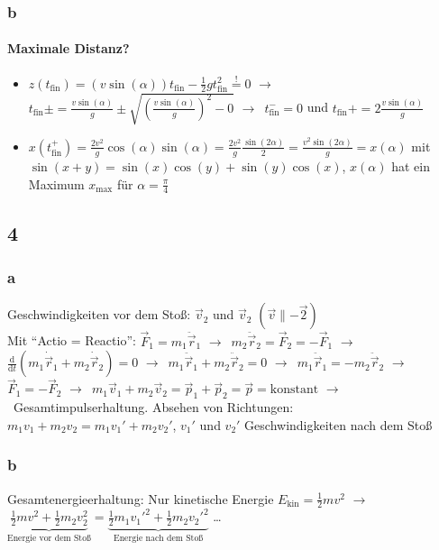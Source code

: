 \documentclass[oneside]{book}
\theoremstyle{definition}
\newcommand{\conseq}{$\rightarrow$~}
\renewcommand{\d}{\mathrm d}
\newcommand{\dd}[1]{\frac{\d}{\d #1}}
\newcommand{\dotvec}[1]{\dot{\vec{#1}}}
\newcommand{\ddotvec}[1]{\ddot{\vec{#1}}}
\newcommand{\tfin}{t_\text{fin}}
\begin{document}
\subsubsection{b}

\paragraph{Maximale Distanz?}
\begin{itemize}
	\item $z(\tfin) = (v \sin(\alpha)) \tfin - \frac{1}{2} g \tfin^2 \overset{!}{=} 0$ \conseq $\tfin\pm = \frac{v \sin(\alpha)}{g} \pm \sqrt{(\frac{v \sin(\alpha)}{g})^2 - 0}$ \conseq $\tfin^- = 0$ und $\tfin+ = 2 \frac{v \sin(\alpha)}{g}$
	\item $x(\tfin^+) = \frac{2 v^2}{g} \cos(\alpha) \sin(\alpha) = \frac{2v^2}{g} \frac{\sin(2\alpha)}{2} = \frac{v^2 \sin(2 \alpha)}{g} = x(\alpha)$ mit $\sin(x + y) = \sin(x)\cos(y) + \sin(y)\cos(x)$, $x(\alpha)$ hat ein Maximum $x_\text{max}$ für $\alpha = \frac{\pi}{4}$
\end{itemize} 


\subsection{4}

\subsubsection{a}
Geschwindigkeiten vor dem Stoß: $\vec{v}_2$ und $\vec{v}_2$ $(\vec{v} \parallel - \vec{2})$\\
Mit "`Actio = Reactio"': $\vec{F}_1 = m_1 \ddotvec{r}_1$ \conseq $m_2 \ddotvec{r}_2 = \vec{F}_2 = - \vec{F}_1$ \conseq $\dd t (m_1 \dotvec{r}_1 + m_2 \dotvec{r}_2) = 0$ \conseq $m_1 \ddotvec{r}_1 + m_2 \ddotvec{r}_2 = 0$ \conseq $m_1 \ddotvec{r}_1 = -m_2 \ddotvec{r}_2$ \conseq $\vec{F}_1 = -\vec{F}_2$ \conseq $m_1 \vec{v}_1 + m_2 \vec{v}_2 = \vec{p}_1 + \vec{p}_2 = \vec{p} = \text{konstant}$ \conseq Gesamtimpulserhaltung. Absehen von Richtungen: $m_1 v_1 + m_2 v_2 = m_1 v_1' + m_2 v_2'$, $v_1'$ und $v_2'$ Geschwindigkeiten nach dem Stoß

\subsubsection{b}
Gesamtenergieerhaltung: Nur kinetische Energie $E_\text{kin} = \frac12 m v^2$ \conseq $\underbrace{\frac12 m v^2 + \frac12 m_2 v_2^2}_\text{Energie vor dem Stoß} = \underbrace{\frac12 m_1 v_1'^2 + \frac{1}{2} m_2 v_2'^2}_\text{Energie nach dem Stoß}$ \dots
\end{document}
